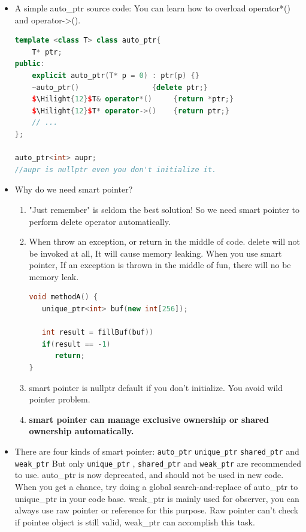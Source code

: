 \documentclass[a4paper,12pt,twoside]{book}
\newcommand{\Hilight}[1]{\makebox[0pt][l]{\color{yellow}\rule[-3pt]{#1em}{11pt}}}
\begin{document}
\begin{itemize}
\item A simple auto\_ptr source code: You can learn how to overload operator*() and operator->().
\begin{lstlisting}[frame=single, language=c++, mathescape=true]
template <class T> class auto_ptr{
    T* ptr;
public:
    explicit auto_ptr(T* p = 0) : ptr(p) {}
    ~auto_ptr()                 {delete ptr;}
    $\Hilight{12}$T& operator*()     {return *ptr;}
    $\Hilight{12}$T* operator->()    {return ptr;}
    // ...
};

auto_ptr<int> aupr;
//aupr is nullptr even you don't initialize it.
\end{lstlisting}

\item Why do we need smart pointer?
\begin{enumerate}
\item "Just remember" is seldom the best solution! So we need smart pointer to perform delete operator automatically.

\item When throw an exception, or return in the middle of code. delete will not be invoked at all, It will cause memory leaking. When you use smart pointer, If an exception is thrown in the middle of fun, there will no be memory leak.
\begin{lstlisting}[frame=single, language=c++]
void methodA() {
   unique_ptr<int> buf(new int[256]);

   int result = fillBuf(buf))
   if(result == -1)
      return;
}
\end{lstlisting}

\item smart pointer is nullptr default if you don't initialize. You avoid wild pointer problem.

\item \textbf{smart pointer can manage exclusive ownership or shared ownership automatically. }
\end{enumerate}

\item There are four kinds of smart pointer: \texttt{auto\_ptr} \texttt{unique\_ptr} \texttt{shared\_ptr} and \texttt{weak\_ptr}  But only \texttt{unique\_ptr} , \texttt{shared\_ptr} and \texttt{weak\_ptr} are recommended to use. auto\_ptr is now deprecated, and should not be used in new code. When you get a chance, try doing a global search-and-replace of auto\_ptr to unique\_ptr in your code base. weak\_ptr is mainly used for observer, you can always use raw pointer or reference for this purpose. Raw pointer can't check if pointee object is still valid, weak\_ptr can accomplish this task.


\end{itemize}
\end{document}
